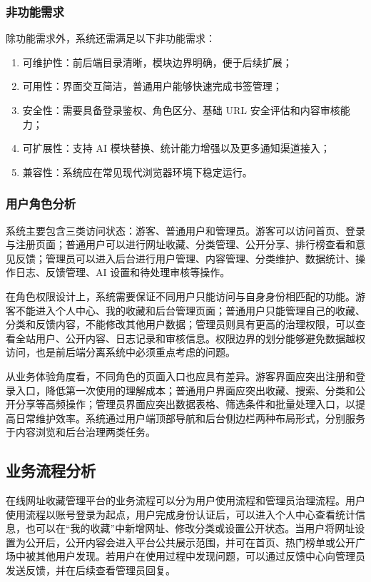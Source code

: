 \documentclass[12pt,a4paper]{ctexart}
\begin{document}
\subsubsection{非功能需求}
除功能需求外，系统还需满足以下非功能需求：

\begin{enumerate}[label=\arabic.]
    \item 可维护性：前后端目录清晰，模块边界明确，便于后续扩展；
    \item 可用性：界面交互简洁，普通用户能够快速完成书签管理；
    \item 安全性：需要具备登录鉴权、角色区分、基础 URL 安全评估和内容审核能力；
    \item 可扩展性：支持 AI 模块替换、统计能力增强以及更多通知渠道接入；
    \item 兼容性：系统应在常见现代浏览器环境下稳定运行。
\end{enumerate}

\subsubsection{用户角色分析}
系统主要包含三类访问状态：游客、普通用户和管理员。游客可以访问首页、登录与注册页面；普通用户可以进行网址收藏、分类管理、公开分享、排行榜查看和意见反馈；管理员可以进入后台进行用户管理、内容管理、分类维护、数据统计、操作日志、反馈管理、AI 设置和待处理审核等操作。

在角色权限设计上，系统需要保证不同用户只能访问与自身身份相匹配的功能。游客不能进入个人中心、我的收藏和后台管理页面；普通用户只能管理自己的收藏、分类和反馈内容，不能修改其他用户数据；管理员则具有更高的治理权限，可以查看全站用户、公开内容、日志记录和审核信息。权限边界的划分能够避免数据越权访问，也是前后端分离系统中必须重点考虑的问题。

从业务体验角度看，不同角色的页面入口也应具有差异。游客界面应突出注册和登录入口，降低第一次使用的理解成本；普通用户界面应突出收藏、搜索、分类和公开分享等高频操作；管理员界面应突出数据表格、筛选条件和批量处理入口，以提高日常维护效率。系统通过用户端顶部导航和后台侧边栏两种布局形式，分别服务于内容浏览和后台治理两类任务。


\subsection{业务流程分析}
在线网址收藏管理平台的业务流程可以分为用户使用流程和管理员治理流程。用户使用流程以账号登录为起点，用户完成身份认证后，可以进入个人中心查看统计信息，也可以在“我的收藏”中新增网址、修改分类或设置公开状态。当用户将网址设置为公开后，公开内容会进入平台公共展示范围，并可在首页、热门榜单或公开广场中被其他用户发现。若用户在使用过程中发现问题，可以通过反馈中心向管理员发送反馈，并在后续查看管理员回复。
\end{document}
